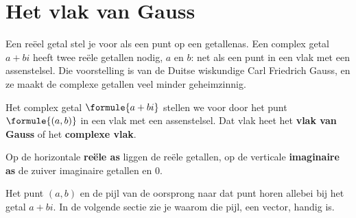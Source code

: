 
\begin{oefeningen}
\end{oefeningen}

\section{Het vlak van Gauss}

Een reëel getal stel je voor als een punt op een getallenas. Een complex getal $a + bi$ heeft twee reële getallen nodig, $a$ en $b$: net als een punt in een vlak met een assenstelsel. Die voorstelling is van de Duitse wiskundige Carl Friedrich Gauss, en ze maakt de complexe getallen veel minder geheimzinnig.

\begin{theorie}
\begin{minipage}[t]{.55\linewidth}
\vspace{0pt}
Het complex getal $\formule{a + bi}$ stellen we voor door het punt $\formule{(a, b)}$ in een vlak met een assenstelsel. Dat vlak heet het \textbf{\textcolor{accent}{vlak van Gauss}} of het \textbf{\textcolor{accent}{complexe vlak}}.

\vspace{1mm}
Op de horizontale \textbf{\textcolor{accent}{reële as}} liggen de reële getallen, op de verticale \textbf{\textcolor{accent}{imaginaire as}} de zuiver imaginaire getallen en 0.
\end{minipage}\hfill
\begin{minipage}[t]{.4\linewidth}
\vspace{0pt}
\end{minipage}
\end{theorie}

Het punt $(a, b)$ en de pijl van de oorsprong naar dat punt horen allebei bij het getal $a + bi$. In de volgende sectie zie je waarom die pijl, een vector, handig is.

